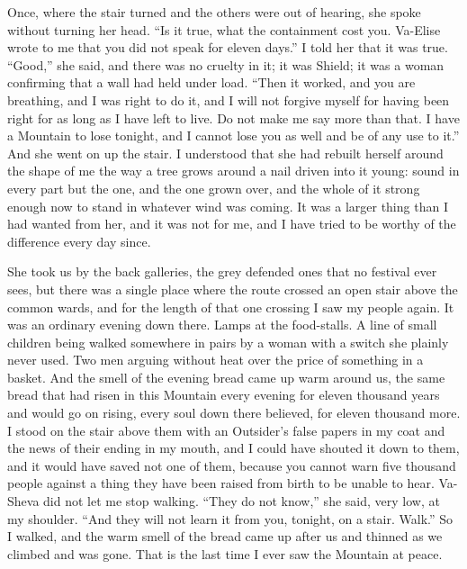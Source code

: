Once, where the stair turned and the others were out of hearing, she spoke without turning her head. ``Is it true, what the containment cost you. Va-Elise wrote to me that you did not speak for eleven days.'' I told her that it was true. ``Good,'' she said, and there was no cruelty in it; it was Shield; it was a woman confirming that a wall had held under load. ``Then it worked, and you are breathing, and I was right to do it, and I will not forgive myself for having been right for as long as I have left to live. Do not make me say more than that. I have a Mountain to lose tonight, and I cannot lose you as well and be of any use to it.'' And she went on up the stair. I understood that she had rebuilt herself around the shape of me the way a tree grows around a nail driven into it young: sound in every part but the one, and the one grown over, and the whole of it strong enough now to stand in whatever wind was coming. It was a larger thing than I had wanted from her, and it was not for me, and I have tried to be worthy of the difference every day since.\par

\ornament

She took us by the back galleries, the grey defended ones that no festival ever sees, but there was a single place where the route crossed an open stair above the common wards, and for the length of that one crossing I saw my people again. It was an ordinary evening down there. Lamps at the food-stalls. A line of small children being walked somewhere in pairs by a woman with a switch she plainly never used. Two men arguing without heat over the price of something in a basket. And the smell of the evening bread came up warm around us, the same bread that had risen in this Mountain every evening for eleven thousand years and would go on rising, every soul down there believed, for eleven thousand more. I stood on the stair above them with an Outsider's false papers in my coat and the news of their ending in my mouth, and I could have shouted it down to them, and it would have saved not one of them, because you cannot warn five thousand people against a thing they have been raised from birth to be unable to hear. Va-Sheva did not let me stop walking. ``They do not know,'' she said, very low, at my shoulder. ``And they will not learn it from you, tonight, on a stair. Walk.'' So I walked, and the warm smell of the bread came up after us and thinned as we climbed and was gone. That is the last time I ever saw the Mountain at peace.\par

